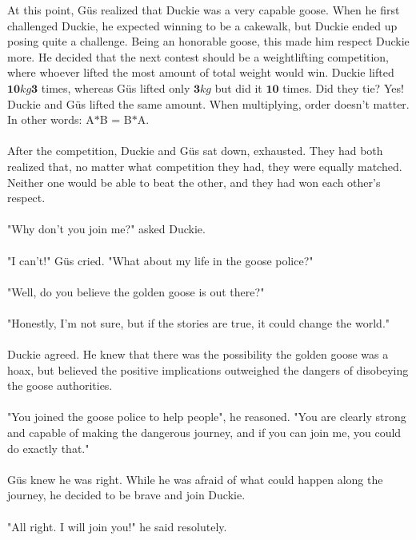 {}
{At this point, Güs realized that Duckie was a very capable goose. When he first challenged Duckie, he expected winning to be a cakewalk, but Duckie ended up posing quite a challenge. Being an honorable goose, this made him respect Duckie more. He decided that the next contest should be a weightlifting competition, where whoever lifted the most amount of total weight would win. Duckie lifted $\mathbf{10} kg  \mathbf{3}$ times, whereas Güs lifted only $\mathbf{3} kg$ but did it $\mathbf{10}$ times. Did they tie?}
{Yes! Duckie and Güs lifted the same amount.}
{When multiplying, order doesn't matter. In other words: A$\ast$B = B$\ast$A.}
{}
\paragraph{} After the competition, Duckie and Güs sat down, exhausted. They had both realized that, no matter what competition they had, they were equally matched. Neither one would be able to beat the other, and they had won each other's respect. 
\paragraph{} "Why don't you join me?" asked Duckie.
\paragraph{} "I can't!" Güs cried. "What about my life in the goose police?"
\paragraph{} "Well, do you believe the golden goose is out there?"
\paragraph{} "Honestly, I'm not sure, but if the stories are true, it could change the world."
\paragraph{} Duckie agreed. He knew that there was the possibility the golden goose was a hoax, but believed the positive implications outweighed the dangers of disobeying the goose authorities. 
\paragraph{} "You joined the goose police to help people", he reasoned. "You are clearly strong and capable of making the dangerous journey, and if you can join me, you could do exactly that."
\paragraph{} Güs knew he was right. While he was afraid of what could happen along the journey, he decided to be brave and join Duckie. 
\paragraph{} "All right. I will join you!" he said resolutely. 